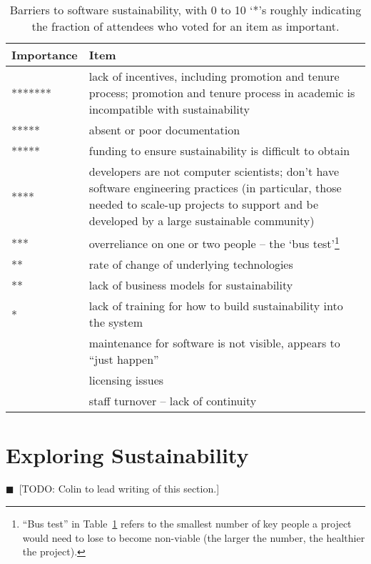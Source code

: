 \documentclass[11pt, oneside]{amsart}
\newcommand{\todo}[1]{{\color{blue}$\blacksquare$~\textsf{[TODO: #1]}}}
\begin{document}
\begin{table}[ht]
\caption{Barriers to software sustainability, with 0 to 10 `*'s roughly
indicating the fraction of attendees who voted for an item as important.}  
\label{tb:software_sustainability_barriers} 
 \centering
  \begin{scriptsize}
  \begin{tabular}{ | p{1.65cm} | p{10.0cm} |}
   \hline
  Importance & Item \\ \hline \hline
******* & lack of incentives, including promotion and tenure process; promotion
and tenure process in academic is incompatible with sustainability \\ \hline
*****  & absent or poor documentation \\ \hline
***** & funding to ensure sustainability is difficult to obtain \\ \hline
**** & developers are not computer scientists; don't have software engineering
practices (in particular, those needed to scale-up projects to support and be
developed by a large sustainable community) \\ \hline
*** & overreliance on one or two people -- the `bus test'\footnote{``Bus test''
in Table~\ref{tb:software_sustainability_barriers} refers to the smallest number
of key people a project would need to lose to become non-viable (the larger the
number, the healthier the project).} \\ \hline
** & rate of change of underlying technologies \\ \hline
** & lack of business models for sustainability \\ \hline
* & lack of training for how to build sustainability into the system \\ \hline
 & maintenance for software is not visible, appears to ``just happen'' \\ \hline
 & licensing issues \\ \hline
 & staff turnover -- lack of continuity \\ \hline
\end{tabular}
 \end{scriptsize}
\end{table}

\section{Exploring Sustainability} \label{sec:exploring}
\todo{Colin to lead writing of this section.}
\end{document}
